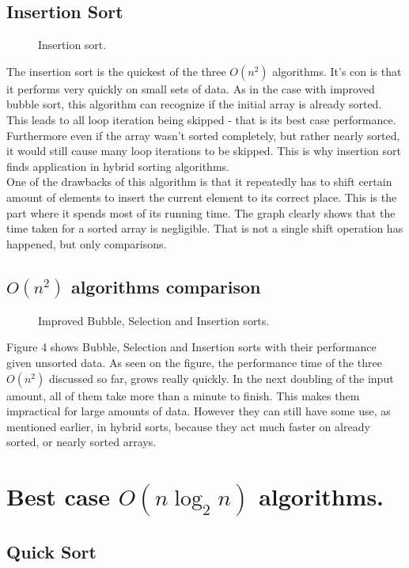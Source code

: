 \documentclass{acm_proc_article-sp}
\begin{document}
\subsection{Insertion Sort}
\begin{figure}[h]
\caption{Insertion sort.}
\end{figure}
The insertion sort is the quickest of the three $O(n^2)$ algorithms. It's con is that it performs very quickly on small sets of data. As in the case with improved bubble sort, this algorithm can recognize if the initial array is already sorted. This leads to all loop iteration being skipped - that is its best case performance. Furthermore even if the array wasn't sorted completely, but rather nearly sorted, it would still cause many loop iterations to be skipped. This is why  insertion sort finds application in hybrid sorting algorithms. \\
One of the drawbacks of this algorithm is that it repeatedly has to shift certain amount of elements to insert the current element to its correct place. This is the part where it spends most of its running time. The graph clearly shows that the time taken for a sorted array is negligible. That is not a single shift operation has happened, but only comparisons.
\subsection{$O(n^2)$ algorithms comparison} 
\begin{figure}[h]
\caption{Improved Bubble, Selection and Insertion sorts.}
\end{figure}
Figure 4 shows  Bubble, Selection and Insertion sorts with their performance given unsorted data. As seen on the figure, the performance time of the three $O(n^2)$ discussed so far, grows really quickly. In the next doubling of the input amount, all of them take more than a minute to finish. This makes them impractical for large amounts of data. However they can still have some use, as mentioned earlier, in hybrid sorts, because they act much faster on already sorted, or nearly sorted arrays.
\section{Best case $O(n \log_2 n)$ algorithms.} 
\subsection{Quick Sort}
\end{document}

